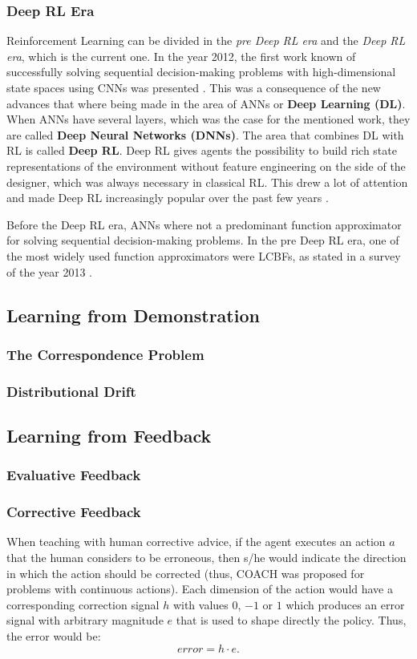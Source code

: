 \subsubsection{Deep RL Era}
Reinforcement Learning can be divided in the \emph{pre Deep RL era} and the \emph{Deep RL era}, which is the current one. In the year 2012, the first work known of successfully solving sequential decision-making problems with high-dimensional state spaces using CNNs was presented \cite{Mnih2015}. This was a consequence of the new advances that where being made in the area of ANNs or \textbf{Deep Learning (DL)}. When ANNs have several layers, which was the case for the mentioned work, they are called \textbf{Deep Neural Networks (DNNs)}. The area that combines DL with RL is called \textbf{Deep RL}. Deep RL gives agents the possibility to build rich state representations of the environment without feature engineering on the side of the designer, which was always necessary in classical RL. This drew a lot of attention and made Deep RL increasingly popular over the past few years \cite{franccois2018introduction}.

Before the Deep RL era, ANNs where not a predominant function approximator for solving sequential decision-making problems. In the pre Deep RL era, one of the most widely used function approximators were LCBFs, as stated in a survey of the year 2013 \cite{kober2013reinforcement}. 

\subsection{Learning from Demonstration}
\subsubsection{The Correspondence Problem}
\subsubsection{Distributional Drift}
\subsection{Learning from Feedback}
\subsubsection{Evaluative Feedback}
\subsubsection{Corrective Feedback}
When teaching with human corrective advice, if the agent executes an action $a$ that the human considers to be erroneous, then s/he would indicate the direction in which the action should be corrected (thus, COACH was proposed for problems with continuous actions). Each dimension of the action would have a corresponding correction signal $h$ with values $0$, $-1$ or $1$ which produces an error signal with arbitrary magnitude $e$ that is used to shape directly the policy. Thus, the error would be: 
\begin{equation}\label{eq:error}
    error=h \cdot e.
\end{equation}

